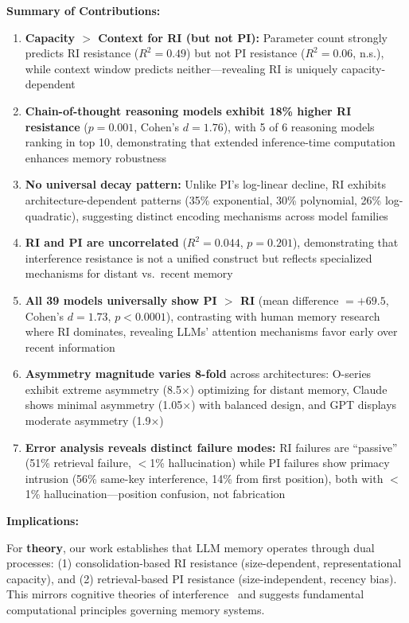 \documentclass{article}
\begin{document}
\textbf{Summary of Contributions:}
\begin{enumerate}[itemsep=4pt,topsep=4pt,parsep=0pt]
    \item \textbf{Capacity $>$ Context for RI (but not PI):} Parameter count strongly predicts RI resistance ($R^2 = 0.49$) but not PI resistance ($R^2 = 0.06$, n.s.), while context window predicts neither---revealing RI is uniquely capacity-dependent
    \item \textbf{Chain-of-thought reasoning models exhibit 18\% higher RI resistance} ($p = 0.001$, Cohen's $d = 1.76$), with 5 of 6 reasoning models ranking in top 10, demonstrating that extended inference-time computation enhances memory robustness
    \item \textbf{No universal decay pattern:} Unlike PI's log-linear decline, RI exhibits architecture-dependent patterns (35\% exponential, 30\% polynomial, 26\% log-quadratic), suggesting distinct encoding mechanisms across model families
    \item \textbf{RI and PI are uncorrelated} ($R^2 = 0.044$, $p = 0.201$), demonstrating that interference resistance is not a unified construct but reflects specialized mechanisms for distant vs.\ recent memory
    \item \textbf{All 39 models universally show PI $>$ RI} (mean difference $= +69.5$, Cohen's $d = 1.73$, $p < 0.0001$), contrasting with human memory research where RI dominates, revealing LLMs' attention mechanisms favor early over recent information
    \item \textbf{Asymmetry magnitude varies 8-fold} across architectures: O-series exhibit extreme asymmetry (8.5$\times$) optimizing for distant memory, Claude shows minimal asymmetry (1.05$\times$) with balanced design, and GPT displays moderate asymmetry (1.9$\times$)
    \item \textbf{Error analysis reveals distinct failure modes:} RI failures are ``passive'' (51\% retrieval failure, $<$1\% hallucination) while PI failures show primacy intrusion (56\% same-key interference, 14\% from first position), both with $<$1\% hallucination---position confusion, not fabrication
\end{enumerate}

\textbf{Implications:}

For \textbf{theory}, our work establishes that LLM memory operates through dual processes: (1) consolidation-based RI resistance (size-dependent, representational capacity), and (2) retrieval-based PI resistance (size-independent, recency bias). This mirrors cognitive theories of interference~\citep{underwood1957interference, wixted2004consolidation} and suggests fundamental computational principles governing memory systems.
\end{document}
